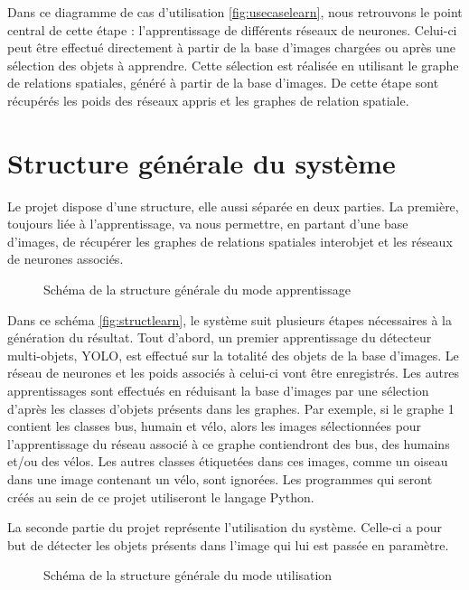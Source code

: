 \documentclass[debug,nodate,hideweeklyreports,noposter]{polytech/polytech}
\begin{document}
Dans ce diagramme de cas d’utilisation \autoref{fig:usecaselearn}, nous retrouvons le point central de cette étape : l’apprentissage de différents réseaux de neurones. Celui-ci peut être effectué directement à partir de la base d’images chargées ou après une sélection des objets à apprendre. Cette sélection est réalisée en utilisant le graphe de relations spatiales, généré à partir de la base d’images. De cette étape sont récupérés les poids des réseaux appris et les graphes de relation spatiale.

\section{Structure générale du système}

Le projet dispose d’une structure, elle aussi séparée en deux parties.
La première, toujours liée à l’apprentissage, va nous permettre, en partant d’une base d’images, de récupérer les graphes de relations spatiales interobjet et les réseaux de neurones associés.

\begin{figure}
  \caption{Schéma de la structure générale du mode apprentissage}
  \label{fig:structlearn}
\end{figure}

Dans ce schéma \autoref{fig:structlearn}, le système suit plusieurs étapes nécessaires à la génération du résultat. 
Tout d’abord, un premier apprentissage du détecteur multi-objets, YOLO, est effectué sur la totalité des objets de la base d’images. Le réseau de neurones et les poids associés à celui-ci vont être enregistrés.
Les autres apprentissages sont effectués en réduisant la base d’images par une sélection d’après les classes d’objets présents dans les graphes.
Par exemple, si le graphe 1 contient les classes bus, humain et vélo, alors les images sélectionnées pour l’apprentissage du réseau associé à ce graphe contiendront des bus, des humains et/ou des vélos. Les autres classes étiquetées dans ces images, comme un oiseau dans une image contenant un vélo, sont ignorées.
Les programmes qui seront créés au sein de ce projet utiliseront le langage Python.

La seconde partie du projet représente l’utilisation du système. Celle-ci a pour but de détecter les objets présents dans l’image qui lui est passée en paramètre.

\begin{figure}
  \caption{Schéma de la structure générale du mode utilisation}
  \label{fig:structuse}
\end{figure}
\end{document}
